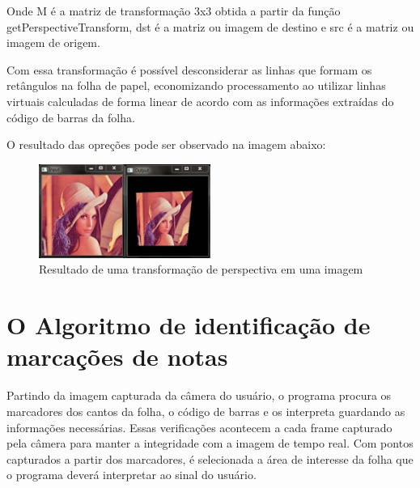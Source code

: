 \documentclass[12pt]{report}
\begin{document}
Onde M é a matriz de transformação 3x3 obtida a partir da função getPerspectiveTransform, dst é a matriz ou imagem de destino e src é a matriz ou imagem de origem.

Com essa transformação é possível desconsiderar as linhas que formam os retângulos na folha de papel, economizando processamento ao utilizar linhas virtuais calculadas de forma linear de acordo com as informações extraídas do código de barras da folha.

O resultado das opreções pode ser observado na imagem abaixo:

\begin{figure}[H]
  \centering
    \includegraphics[width=0.5\textwidth]{imagens/Perspective_Transform.JPG}
    \caption{Resultado de uma transformação de perspectiva em uma imagem}
  \label{fig:perspectiva}
\end{figure}

\chapter{O Algoritmo de identificação de marcações de notas}
\label{cha:cha2}

Partindo da imagem capturada da câmera do usuário, o programa procura
os marcadores dos cantos da folha, o código de barras e os interpreta
guardando as informações necessárias. Essas verificações acontecem a
cada frame capturado pela câmera para manter a integridade com a
imagem de tempo real.  Com pontos capturados a partir dos marcadores,
é selecionada a área de interesse da folha que o programa deverá
interpretar ao sinal do usuário.
\end{document}
